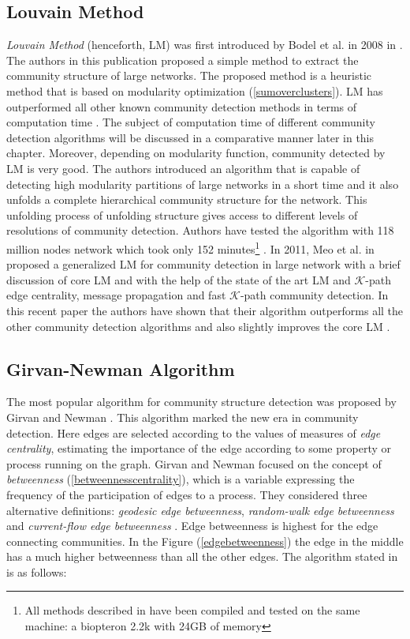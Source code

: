{\subsection{Louvain Method}\label{subsec:louvain_method}
\textit{Louvain Method} (henceforth, LM) was first introduced by Bodel et al. in 2008 in \cite{ref-27}. The authors in this publication proposed a simple method to extract the community structure of large networks. The proposed method is a heuristic method that is based on modularity optimization (\ref{sumoverclusters}). LM has outperformed all other known community detection methods in terms of computation time \cite{ref-28}. The subject of computation time of different community detection algorithms will be discussed in a comparative manner later in this chapter. Moreover, depending on modularity function, community detected by LM is very good. The authors introduced an algorithm that is capable of detecting high modularity partitions of large networks in a short time and it also unfolds a complete hierarchical community structure for the network. This unfolding process of unfolding structure gives access to different levels of resolutions of community detection. Authors have tested the algorithm with 118 million nodes network which took only 152 minutes\footnote{All methods described in \cite{ref-27} have been compiled and tested on the same machine: a biopteron
2.2k with 24GB of memory} \cite{ref-27}. In 2011, Meo et al. in \cite{ref-28} proposed a generalized LM for community detection in large network with a brief discussion of core LM \cite{ref-27} and with the help of the state of the art LM and $\mathcal{K}$-path edge centrality, message propagation and fast $\mathcal{K}$-path community detection. In this recent paper the authors have shown that their algorithm outperforms all the other community detection algorithms and also slightly improves the core LM \cite{ref-28}.

\subsection{Girvan-Newman Algorithm}\label{girvan-newman}
The most popular algorithm for community structure detection was proposed by Girvan and Newman \cite{ref-1}. This algorithm marked the new era in community detection. Here edges are selected according to the values of measures of \textit{edge centrality}, estimating the importance of the edge according to some property or process running on the graph. Girvan and Newman focused on the concept of \textit{betweenness} (\ref{betweennesscentrality}), which is a variable expressing the frequency of the participation of edges to a process. They considered three alternative definitions: \textit{geodesic edge betweenness}, \textit{random-walk edge betweenness} and \textit{current-flow edge betweenness} \cite{ref-6}. Edge betweenness is highest for the edge connecting communities. In the Figure (\ref{edgebetweenness}) the edge in the middle has a much higher betweenness than all the other edges. The algorithm stated in \cite{ref-1} is as follows:

}
